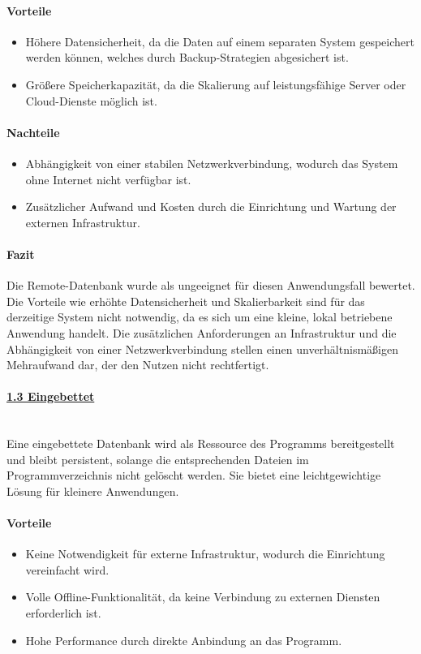 \documentclass[a4paper,12pt]{report}
\begin{document}
    \paragraph{Vorteile}
    \begin{itemize}
        \item Höhere Datensicherheit, da die Daten auf einem separaten System gespeichert werden können, welches durch Backup-Strategien abgesichert ist.
        \item Größere Speicherkapazität, da die Skalierung auf leistungsfähige Server oder Cloud-Dienste möglich ist.
    \end{itemize}

    \paragraph{Nachteile}
    \begin{itemize}
        \item Abhängigkeit von einer stabilen Netzwerkverbindung, wodurch das System ohne Internet nicht verfügbar ist.
        \item Zusätzlicher Aufwand und Kosten durch die Einrichtung und Wartung der externen Infrastruktur.
    \end{itemize}

    \paragraph{Fazit}
    Die Remote-Datenbank wurde als ungeeignet für diesen Anwendungsfall bewertet.
    Die Vorteile wie erhöhte Datensicherheit und Skalierbarkeit sind für das derzeitige System nicht notwendig, da es sich um eine kleine, lokal betriebene Anwendung handelt.
    Die zusätzlichen Anforderungen an Infrastruktur und die Abhängigkeit von einer Netzwerkverbindung stellen einen unverhältnismäßigen Mehraufwand dar, der den Nutzen nicht rechtfertigt.

    \paragraph{\underline{1.3 Eingebettet}}\mbox{}\\
    Eine eingebettete Datenbank wird als Ressource des Programms bereitgestellt und bleibt persistent, solange die entsprechenden Dateien im Programmverzeichnis nicht gelöscht werden.
    Sie bietet eine leichtgewichtige Lösung für kleinere Anwendungen.

    \paragraph{Vorteile}
    \begin{itemize}
        \item Keine Notwendigkeit für externe Infrastruktur, wodurch die Einrichtung vereinfacht wird.
        \item Volle Offline-Funktionalität, da keine Verbindung zu externen Diensten erforderlich ist.
        \item Hohe Performance durch direkte Anbindung an das Programm.
    \end{itemize}
\end{document}
